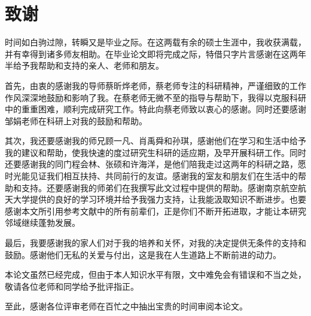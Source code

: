\chapter[致谢]{致\ccwd{}谢}
时间如白驹过隙，转瞬又是毕业之际。在这两载有余的硕士生涯中，我收获满载，并有幸得到诸多师友相助。在毕业论文即将完成之际，特借只字片言感谢在这两年半给予我帮助和支持的亲人、老师和朋友。
\par
首先，由衷的感谢我的导师蔡昕烨老师，蔡老师专注的科研精神，严谨细致的工作作风深深地鼓励和影响了我。在蔡老师无微不至的指导与帮助下，我得以克服科研中的重重困难，顺利完成研究工作。特此向蔡老师致以衷心的感谢。同时还要感谢邹娟老师在科研上对我的鼓励和帮助。
\par
其次，我还要感谢我的师兄顾一凡、肖禹舜和孙琪，感谢他们在学习和生活中给予我的建议和帮助，使我快速的度过研究生科研的适应期，及早开展科研工作。同时还要感谢我的同门程会林、张硕和许海洋，是他们陪我走过这两年的科研之路，愿时光能见证我们相互扶持、共同前行的友谊。感谢我的室友和朋友们在生活中的帮助和支持。还要感谢我的师弟们在我撰写此文过程中提供的帮助。感谢南京航空航天大学提供的良好的学习环境并给予我强力支持，让我能汲取知识不断进步。也要感谢本文所引用参考文献中的所有前辈们，正是你们不断开拓进取，才能让本研究邻域继续蓬勃发展。
\par
最后，我要感谢我的家人们对于我的培养和关怀，对我的决定提供无条件的支持和鼓励。感谢他们无私的关爱与付出，这是我在人生道路上不断前进的动力。
\par
本论文虽然已经完成，但由于本人知识水平有限，文中难免会有错误和不当之处，敬请各位老师和同学给予批评指正。
\par
至此，感谢各位评审老师在百忙之中抽出宝贵的时间审阅本论文。

